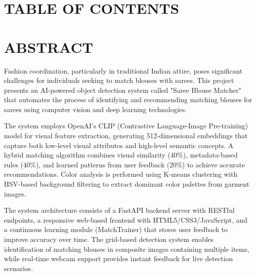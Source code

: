 \documentclass[12pt,a4paper]{report}
\begin{document}
\chapter*{TABLE OF CONTENTS}

\vspace{1cm}


\newpage

\chapter*{ABSTRACT}

\vspace{1cm}

\justify
Fashion coordination, particularly in traditional Indian attire, poses significant challenges for individuals seeking to match blouses with sarees. This project presents an AI-powered object detection system called "Saree Blouse Matcher" that automates the process of identifying and recommending matching blouses for sarees using computer vision and deep learning technologies.

\vspace{0.5cm}

The system employs OpenAI's CLIP (Contrastive Language-Image Pre-training) model for visual feature extraction, generating 512-dimensional embeddings that capture both low-level visual attributes and high-level semantic concepts. A hybrid matching algorithm combines visual similarity (40\%), metadata-based rules (40\%), and learned patterns from user feedback (20\%) to achieve accurate recommendations. Color analysis is performed using K-means clustering with HSV-based background filtering to extract dominant color palettes from garment images.

\vspace{0.5cm}

The system architecture consists of a FastAPI backend server with RESTful endpoints, a responsive web-based frontend with HTML5/CSS3/JavaScript, and a continuous learning module (MatchTrainer) that stores user feedback to improve accuracy over time. The grid-based detection system enables identification of matching blouses in composite images containing multiple items, while real-time webcam support provides instant feedback for live detection scenarios.
\end{document}
